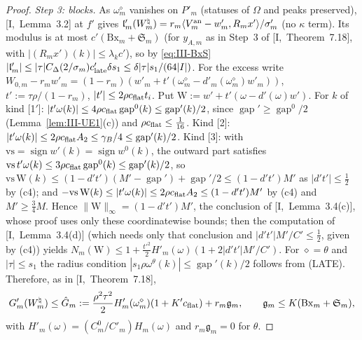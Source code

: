 \documentclass[10pt]{amsart}
\theoremstyle{definition}
\theoremstyle{remark}
\newcommand{\sgn}{\operatorname{sign}}
\newcommand{\gap}{\operatorname{gap}}
\newcommand{\ip}[2]{\langle #1,#2\rangle}
\newcommand{\lin}{\mathfrak l}
\begin{document}
\begin{proof}
\emph{Step 3: blocks.}  As $\omega^\diamond_m$ vanishes on $P'_m$ (statuses of
$\Omega$ and peaks preserved), [I,~Lemma~3.2] at $f'$ gives
$\lin'_m(W^\natural_m)=r_m\ip{V^{\rm an}_m-w'_m}{R_mx'}/\sigma'_m$ (no $\kappa$
term).  Its modulus is at most $c'(\mathrm{Bx}_m+\mathfrak S_m)$ (for $y_{A,m}$
as in Step~3 of [I,~Theorem~7.18], with $|(R_mx')(k)|\le\lambda_kc'$), so by
\eqref{eq:III-BxS} $|\lin'_m|\le|\tau|C_\Delta(2/\sigma_m)c'_{\rm late}\delta s_1\le
\delta|\tau|s_1/(64|I|)$.  For the excess write $W_{0,m}-r_mw'_m=(1-r_m)
(w'_m+t'(\omega^\diamond_m-d'_m(\omega^\diamond_m)w'_m))$, $t':=\tau\rho/(1-r_m)$,
$|t'|\le2\rho c_{\rm flat}t_i$.  Put $\mathrm W:=w'+t'(\omega-d'(\omega)w')$.  For
$k$ of kind [1$'$]: $|t'\omega(k)|\le4\rho c_{\rm flat}\gap^0(k)\le\gap'(k)/2$,
since $\gap'\ge\gap^0/2$ (Lemma~\ref{lem:III-UE1}(c)) and $\rho c_{\rm flat}\le
\frac1{16}$.  Kind [2]: $|t'\omega(k)|\le2\rho c_{\rm flat}A_2\le\gamma_B/4\le
\gap'(k)/2$.  Kind [3]: with $\mathrm{vs}=\sgn w'(k)=\sgn w^0(k)$, the outward part
satisfies $\mathrm{vs}\,t'\omega(k)\le3\rho c_{\rm flat}\gap^0(k)\le\gap'(k)/2$, so
$\mathrm{vs}\,\mathrm W(k)\le(1-d't')(M'-\gap')+\gap'/2\le(1-d't')M'$ as
$|d't'|\le\frac12$ by (c4); and $-\mathrm{vs}\,\mathrm W(k)\le|t'\omega(k)|\le
2\rho c_{\rm flat}A_2\le(1-d't')M'$ by (c4) and $M'\ge\frac34M$.  Hence
$\|\mathrm W\|_\infty=(1-d't')M'$, the conclusion of [I,~Lemma~3.4(c)], whose
proof uses only these coordinatewise bounds; then the computation of
[I,~Lemma~3.4(d)] (which needs only that conclusion and $|d't'|M'/C'\le\frac12$,
given by (c4)) yields $N_m(\mathrm W)\le1+\frac{t'^2}2H'_m(\omega)(1+2|d't'|M'/C')$.
For $\diamond=\theta$ and $|\tau|\le s_1$ the radius condition
$|s_1\rho\omega^\theta(k)|\le\gap'(k)/2$ follows from (LATE).  Therefore, as in
[I,~Theorem~7.18],
\[
 G'_m(W^\natural_m)\le\hat G_m:=\frac{\rho^2\tau^2}2H'_m(\omega^\diamond_m)
 (1+K'c_{\rm flat})+r_m\mathfrak g_m,\qquad\mathfrak g_m\le K(\mathrm{Bx}_m+
 \mathfrak S_m),
\]
with $H'_m(\omega)=(C^0_m/C'_m)H_m(\omega)$ and $r_m\mathfrak g_m=0$ for $\theta$.


\end{proof}
\end{document}
